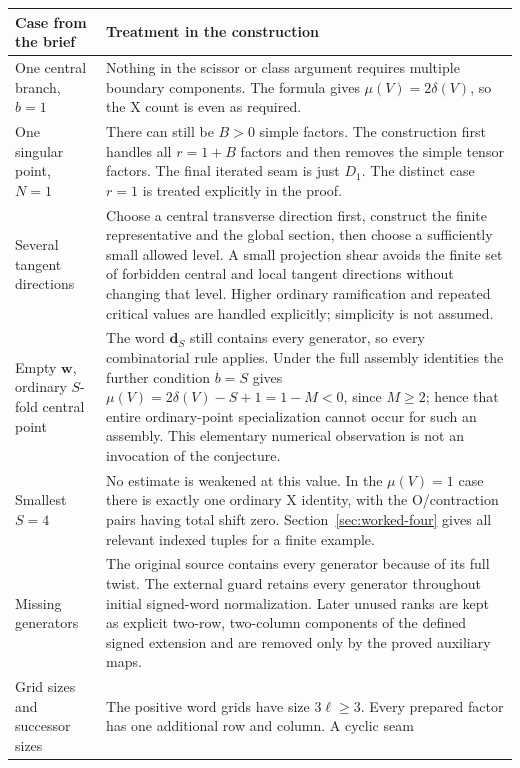 \documentclass[11pt,a4paper]{article}
\theoremstyle{remark}
\begin{document}
\begin{longtable}{>{\raggedright\arraybackslash}p{}>{\raggedright\arraybackslash}p{}}
\toprule
Case from the brief & Treatment in the construction\\
\midrule
\endhead
One central branch, $b=1$ &
Nothing in the scissor or class argument requires multiple boundary
components.  The formula gives $\mu(V)=2\delta(V)$, so the X count
is even as required.\\[5pt]
One singular point, $N=1$ &
There can still be $B>0$ simple factors.  The construction first
handles all $r=1+B$ factors and then removes the simple tensor
factors.  The final iterated seam is just $D_1$.  The distinct case
$r=1$ is treated explicitly in the proof.\\[5pt]
Several tangent directions &
Choose a central transverse direction first, construct the finite
representative and the global section, then choose a sufficiently
small allowed level.  A small projection shear avoids the finite
set of forbidden central and local tangent directions without
changing that level.  Higher ordinary ramification and repeated
critical values are handled explicitly; simplicity is not assumed.\\[5pt]
Empty $\mathbf w$, ordinary $S$-fold central point &
The word $\mathbf d_S$ still contains every generator, so every
combinatorial rule applies.  Under the full assembly identities
the further condition $b=S$ gives
$\mu(V)=2\delta(V)-S+1=1-M<0$, since $M\ge2$; hence that entire
ordinary-point specialization cannot occur for such an assembly.
This elementary numerical observation is not an invocation of
the conjecture.\\[5pt]
Smallest $S=4$ &
No estimate is weakened at this value.  In the $\mu(V)=1$ case
there is exactly one ordinary X identity, with the O/contraction
pairs having total shift zero.  Section~\ref{sec:worked-four}
gives all relevant indexed tuples for a finite example.\\[5pt]
Missing generators &
The original source contains every generator because of its full
twist.  The external guard retains every generator throughout
initial signed-word normalization.  Later unused ranks are kept
as explicit two-row, two-column components of the defined signed
extension and are removed only by the proved auxiliary maps.\\[5pt]
Grid sizes and successor sizes &
The positive word grids have size $3\ell\ge3$.  Every prepared
factor has one additional row and column.  A cyclic seam

\end{longtable}
\end{document}
